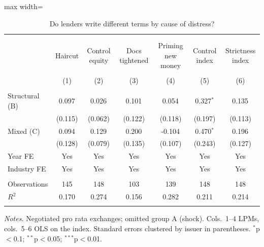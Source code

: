 \begin{table}[!htbp] \centering
  \caption{Do lenders write different terms by cause of distress?}
\begin{adjustbox}{max width=\textwidth}
\begin{tabular}{@{\extracolsep{2pt}}lcccccc}
\\[-1.8ex]\hline
\hline \\[-1.8ex]
\\[-1.8ex] & \multicolumn{1}{c}{Haircut} & \multicolumn{1}{c}{Control equity} & \multicolumn{1}{c}{Docs tightened} & \multicolumn{1}{c}{Priming new money} & \multicolumn{1}{c}{Control index} & \multicolumn{1}{c}{Strictness index}  \\
\\[-1.8ex] & (1) & (2) & (3) & (4) & (5) & (6) \\
\hline \\[-1.8ex]
 Structural (B) & 0.097$^{}$ & 0.026$^{}$ & 0.101$^{}$ & 0.054$^{}$ & 0.327$^{*}$ & 0.135$^{}$ \\
& (0.115) & (0.062) & (0.122) & (0.118) & (0.197) & (0.113) \\
 Mixed (C) & 0.094$^{}$ & 0.129$^{}$ & 0.200$^{}$ & -0.104$^{}$ & 0.470$^{*}$ & 0.196$^{}$ \\
& (0.128) & (0.079) & (0.135) & (0.107) & (0.243) & (0.127) \\
 Year FE & Yes & Yes & Yes & Yes & Yes & Yes \\
 Industry FE & Yes & Yes & Yes & Yes & Yes & Yes \\
\hline \\[-1.8ex]
 Observations & 145 & 148 & 103 & 139 & 148 & 148 \\
 $R^2$ & 0.170 & 0.274 & 0.156 & 0.282 & 0.211 & 0.214 \\
\hline
\hline \\[-1.8ex]
\end{tabular}
\end{adjustbox}
\label{tab:reg_terms}
\begin{minipage}{0.95\textwidth}\vspace{4pt}\footnotesize
\textit{Notes.} Negotiated pro rata exchanges; omitted group A (shock). Cols.\ 1--4 LPMs, cols.\ 5--6 OLS on the index. Standard errors clustered by issuer in parentheses. $^{*}$p$<$0.1; $^{**}$p$<$0.05; $^{***}$p$<$0.01.
\end{minipage}
\end{table}